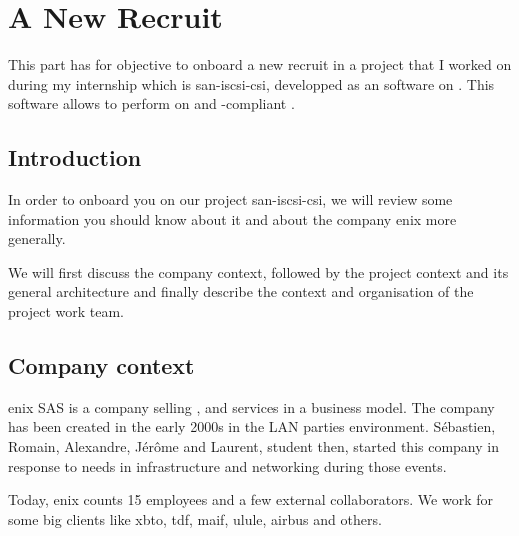 \chapter{A New Recruit}


This part has for objective to onboard a new recruit in a project that I worked on during my internship which is \gls{san-iscsi-csi}, developped as an  software on . This software allows to perform  on  and -compliant .

\clearpage

\section{Introduction}

In order to onboard you on our project \gls{san-iscsi-csi}, we will review some information you should know about it and about the company \gls{enix} more generally.

We will first discuss the company context, followed by the project context and its general architecture and finally describe the context and organisation of the project work team.

\section{Company context}

\gls{enix} SAS is a company selling ,  and  services in a  business model. The company has been created in the early 2000s in the LAN parties environment. Sébastien, Romain, Alexandre, Jérôme and Laurent, student then, started this company in response to needs in infrastructure and networking during those events.

Today, \gls{enix} counts 15 employees and a few external collaborators. We work for some big clients like \gls{xbto}, \gls{tdf}, \gls{maif}, \gls{ulule}, \gls{airbus} and others.

